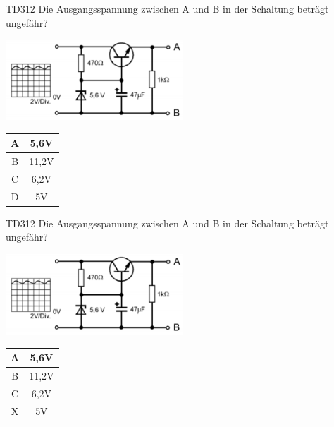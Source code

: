 \begin{frame}
    \begin{center} \Large
        \begin{block}{TD312}
		\large Die Ausgangsspannung zwischen A und B in der Schaltung beträgt ungefähr?\\
		\begin{center}
		\includegraphics[width=0.5\textwidth]{a17/TD312.png}\\
		\end{center}
    	\end{block}
        \begin{tabular}{|c|c|}
        \hline
        A & 5,6V \\ \hline
        B & 11,2V \\ \hline
        C & 6,2V \\ \hline
        D & 5V \\ \hline
        \end{tabular}
    \end{center}
\end{frame}
\begin{frame}
    \begin{center} \Large
        \begin{block}{TD312}
		\large Die Ausgangsspannung zwischen A und B in der Schaltung beträgt ungefähr?\\
		\begin{center}
		\includegraphics[width=0.5\textwidth]{a17/TD312.png}\\
		\end{center}
    	\end{block}
        \begin{tabular}{|c|c|}
        \hline
        A & 5,6V \\ \hline
        B & 11,2V \\ \hline
        C & 6,2V \\ \hline
        X & 5V \\ \hline
        \end{tabular}
    \end{center}
\end{frame}

